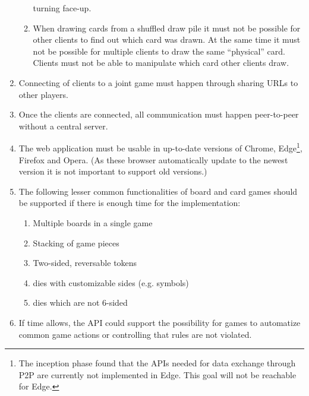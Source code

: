 \begin{enumerate}
\begin{enumerate}
    turning \gls{face}-up.
    \item When drawing cards from a shuffled \gls{draw pile} it must not be
    possible for other clients to find out which card was drawn. At the same
    time it must not be possible for multiple clients to draw the same
    ``physical'' card. Clients must not be able to manipulate which card other
    clients draw.
  \end{enumerate}
  \item Connecting of clients to a joint game must happen through sharing URLs
  to other players.
  \item Once the clients are connected, all communication must happen
  \gls{peer-to-peer} without a central server.
  \item The web application must be usable in up-to-date versions of Chrome,
  Edge\footnote{The inception phase found that the APIs needed for data
  exchange through \gls{P2P} are currently not implemented in Edge. This goal
  will not be reachable for Edge.}, Firefox and Opera. (As these browser
  automatically update to the newest version it is not important to support old
  versions.)
  \item The following lesser common functionalities of board and card games
  should be supported if there is enough time for the implementation:
  \begin{enumerate}
    \item Multiple boards in a single game
    \item Stacking of game pieces
    \item Two-sided, reversable tokens
    \item \Glspl{die} with customizable sides (e.g. symbols)
    \item \Glspl{die} which are not 6-sided
  \end{enumerate}
  \item If time allows, the API could support the possibility for games to
  automatize common game actions or controlling that rules are not violated.
\end{enumerate}
